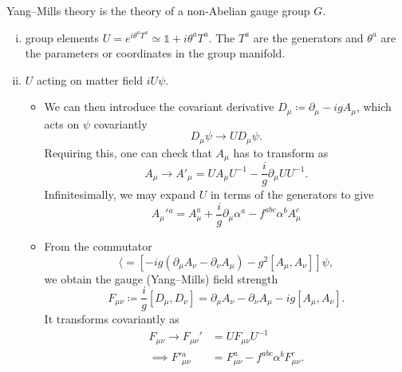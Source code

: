 Yang--Mills theory is the theory of a non-Abelian gauge group $G$.

\begin{enumerate}[(i)]
  \item group elements $U = e^{i \theta^a T^a} \simeq \mathbb{1} + i \theta^a T^a$. The $T^a$ are the generators and  $\theta^a$ are the parameters or coordinates in the group manifold.
   \item $U$  acting on matter field $i U \psi$. 
     \begin{itemize}
       \item We can then introduce the covariant derivative $D_{\mu} \coloneqq \partial_{\mu} - i g A_{\mu}$, which acts on $\psi$ covariantly
       \begin{equation}
         D_{\mu} \psi \to U D_{\mu} \psi.
       \end{equation} 
       Requiring this, one can check that $A_{\mu}$ has to transform as
       \begin{equation}
         A_{\mu} \to A'_{\mu} = U A_{\mu} U^{-1} - \frac{i}{g} \partial_{\mu} U U^{-1}.
       \end{equation}
       Infinitesimally, we may expand $U$ in terms of the generators to give
       \begin{equation}
         A_{\mu}'{}^a = A^a_{\mu} + \frac{i}{g} \partial_{\mu} \alpha^a - f^{abc} \alpha^b A^c_{\mu}
       \end{equation}
       \item From the commutator
	 \begin{equation}
	   [D_{\mu}, D_{\nu}] \langle = \left[ -i g (\partial_{\mu} A_{\nu} - \partial_{\nu} A_{\mu}) -g^2 [A_{\mu}, A_{\nu}] \right] \psi,
	 \end{equation}
	 we obtain the gauge (Yang--Mills) field strength
	 \begin{equation}
	   \label{eq:12-f}
	   F_{\mu\nu} \coloneqq \frac{i}{g} [D_{\mu}, D_{\nu}] = \partial_{\mu} A_{\nu} - \partial_{\nu} A_{\mu} - i g [A_{\mu}, A_{\nu}].
	 \end{equation}
	 It transforms covariantly as
	 \begin{align}
	   F_{\mu\nu} \to F_{\mu\nu}'{} &= U F_{\mu\nu} U^{-1} \\
	   \implies F'{}^a_{\mu\nu} &= F_{\mu\nu}^a - f^{abc} \alpha^b F_{\mu\nu}^c.
	 \end{align}
     \end{itemize}
\end{enumerate}
